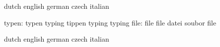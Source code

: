 \stopvariables

\startvariables            dutch                     english
                           german                    czech
                           italian

                    typen: typen                     typing
                           tippen                    typing
                           typing                    %
                     file: file                      file
                           datei                     soubor
                           file                      %

\stopvariables




\startvariables            dutch                     english
                           german                    czech
                           italian

